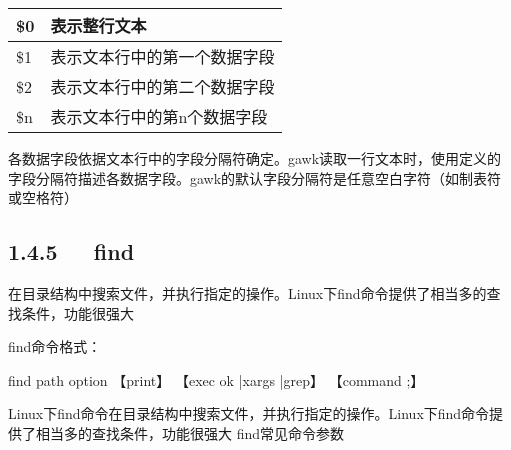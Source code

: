 \documentclass[letterpaper,12pt,english]{sphinxmanual}
\begin{document}
\begin{savenotes}\sphinxattablestart
\centering
\begin{tabulary}{\linewidth}[t]{|T|T|}
\hline
\sphinxstyletheadfamily 
\$0
&\sphinxstyletheadfamily 
表示整行文本
\\
\hline
\$1
&
表示文本行中的第一个数据字段
\\
\hline
\$2
&
表示文本行中的第二个数据字段
\\
\hline
\$n
&
表示文本行中的第n个数据字段
\\
\hline
\end{tabulary}
\par
\sphinxattableend\end{savenotes}

各数据字段依据文本行中的字段分隔符确定。gawk读取一行文本时，使用定义的字段分隔符描述各数据字段。gawk的默认字段分隔符是任意空白字符（如制表符或空格符）


\subsection{1.4.5   find}
\label{\detokenize{001software/001install/linux:id6}}

在目录结构中搜索文件，并执行指定的操作。Linux下find命令提供了相当多的查找条件，功能很强大

find命令格式：

\begin{sphinxVerbatim}[commandchars=\\\{\}]
find path \PYGZhy{}option 【\PYGZhy{}print】 【\PYGZhy{}exec \PYGZhy{}ok |xargs |grep】 【command \PYGZob{}\PYGZcb{} \PYGZbs{};】
\end{sphinxVerbatim}

Linux下find命令在目录结构中搜索文件，并执行指定的操作。Linux下find命令提供了相当多的查找条件，功能很强大
find常见命令参数
\end{document}
